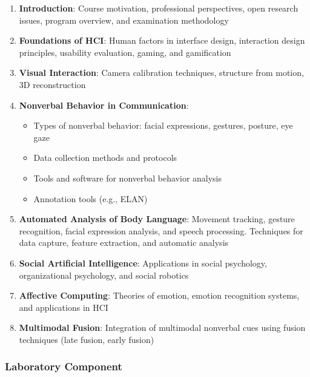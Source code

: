 \documentclass[11pt,a4paper]{article}
\theoremstyle{definition}
\theoremstyle{plain}
\theoremstyle{remark}
\begin{document}
\begin{enumerate}
    \item \textbf{Introduction}: Course motivation, professional perspectives, open research issues, program overview, and examination methodology
    
    \item \textbf{Foundations of HCI}: Human factors in interface design, interaction design principles, usability evaluation, gaming, and gamification
    
    \item \textbf{Visual Interaction}: Camera calibration techniques, structure from motion, 3D reconstruction
    
    \item \textbf{Nonverbal Behavior in Communication}: 
    \begin{itemize}
        \item Types of nonverbal behavior: facial expressions, gestures, posture, eye gaze
        \item Data collection methods and protocols
        \item Tools and software for nonverbal behavior analysis
        \item Annotation tools (e.g., ELAN)
    \end{itemize}
    
    \item \textbf{Automated Analysis of Body Language}: Movement tracking, gesture recognition, facial expression analysis, and speech processing. Techniques for data capture, feature extraction, and automatic analysis
    
    \item \textbf{Social Artificial Intelligence}: Applications in social psychology, organizational psychology, and social robotics
    
    \item \textbf{Affective Computing}: Theories of emotion, emotion recognition systems, and applications in HCI
    
    \item \textbf{Multimodal Fusion}: Integration of multimodal nonverbal cues using fusion techniques (late fusion, early fusion)
\end{enumerate}

\subsubsection{Laboratory Component}
\end{document}
